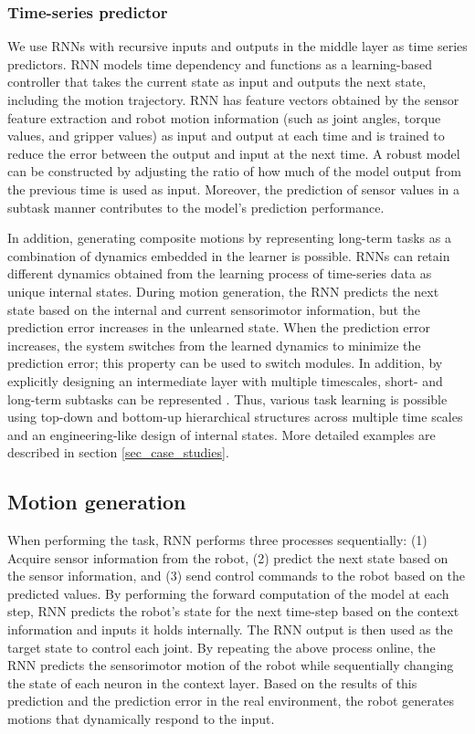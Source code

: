 \subsubsection{Time-series predictor}
We use RNNs with recursive inputs and outputs in the middle layer as time series predictors. RNN models time dependency and functions as a learning-based controller that takes the current state as input and outputs the next state, including the motion trajectory. RNN has feature vectors obtained by the sensor feature extraction and robot motion information (such as joint angles, torque values, and gripper values) as input and output at each time and is trained to reduce the error between the output and input at the next time. A robust model can be constructed by adjusting the ratio of how much of the model output from the previous time is used as input. Moreover, the prediction of sensor values in a subtask manner contributes to the model's prediction performance. 

In addition, generating composite motions by representing long-term tasks as a combination of dynamics embedded in the learner is possible. RNNs can retain different dynamics obtained from the learning process of time-series data as unique internal states. During motion generation, the RNN predicts the next state based on the internal and current sensorimotor information, but the prediction error increases in the unlearned state. When the prediction error increases, the system switches from the learned dynamics to minimize the prediction error; this property can be used to switch modules. In addition, by explicitly designing an intermediate layer with multiple timescales, short- and long-term subtasks can be represented \cite{Hochreiter1997nc, Yamashita2008plos}. Thus, various task learning is possible using top-down and bottom-up hierarchical structures across multiple time scales and an engineering-like design of internal states. More detailed examples are described in section \ref{sec_case_studies}.


\subsection{Motion generation}
When performing the task, RNN performs three processes sequentially: (1) Acquire sensor information from the robot, (2) predict the next state based on the sensor information, and (3) send control commands to the robot based on the predicted values. By performing the forward computation of the model at each step, RNN predicts the robot's state for the next time-step based on the context information and inputs it holds internally. The RNN output is then used as the target state to control each joint. By repeating the above process online, the RNN predicts the sensorimotor motion of the robot while sequentially changing the state of each neuron in the context layer. Based on the results of this prediction and the prediction error in the real environment, the robot generates motions that dynamically respond to the input.

